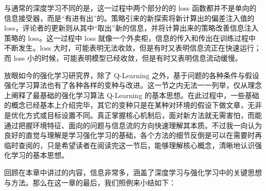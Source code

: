 与通常的深度学习不同的是，这一过程中两个部分的的 loss 函数都并不是单向的信息接受器，而是“有进有出”的。策略引来的新探索将新计算出的偏差注入值的 loss，评论者的更新则从其中“取出”新的信息，并将计算出来的策略改善信息注入策略的 loss。这一过程中 loss 就像一个外卖柜，信息的传入和传出在训练过程中不断发生。loss 大时，可能表明无法收敛，但是有时又表明信息流正在快速运行；而 loss 小的时候，可能表明模型已经收敛，但是有时又表明信息流动缓慢。

放眼如今的强化学习研究界，除了 Q-Learning 之外，基于问题的各种条件与假设强化学习算法也有了各种各样的变种与改进。这一节之内无法一一列举，仅从理念上阐释了最基础的强化学习算法 Q-Learning 的基本思想。在此过程中，一些基础的概念已经基本上介绍完毕，其它的变种只是在某种对环境的假设下做文章，无非是优化方式或目标设置不同。真正掌握核心机制后，面对新方法就无需害怕，而能通过把握环境特征、面向的问题与信息流的方向快速理解其本质。不过我一向认为良好的直觉与理解是学习强化学习的基础，各个方法的细节反倒是可以在需要时再临时查阅的，只是希望读者在阅读完这一节后，能够理解核心概念，清晰地认识强化学习的基本思想。

回顾在本章中讲过的内容，信息非常多，涵盖了深度学习与强化学习中的关键思想与方法。那么在这一章的最后，我们照例来小结如下：

